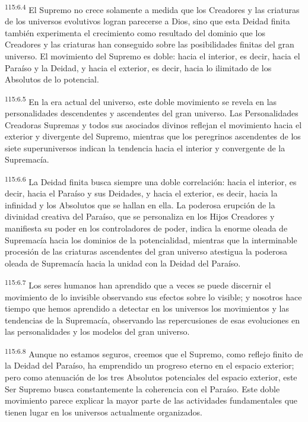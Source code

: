 \par
\textsuperscript{115:6.4} El Supremo no crece solamente a medida que los Creadores y las criaturas de los universos evolutivos logran parecerse a Dios, sino que esta Deidad finita también experimenta el crecimiento como resultado del dominio que los Creadores y las criaturas han conseguido sobre las posibilidades finitas del gran universo. El movimiento del Supremo es doble: hacia el interior, es decir, hacia el Paraíso y la Deidad, y hacia el exterior, es decir, hacia lo ilimitado de los Absolutos de lo potencial.

\par
\textsuperscript{115:6.5} En la era actual del universo, este doble movimiento se revela en las personalidades descendentes y ascendentes del gran universo. Las Personalidades Creadoras Supremas y todos sus asociados divinos reflejan el movimiento hacia el exterior y divergente del Supremo, mientras que los peregrinos ascendentes de los siete superuniversos indican la tendencia hacia el interior y convergente de la Supremacía.

\par
\textsuperscript{115:6.6} La Deidad finita busca siempre una doble correlación: hacia el interior, es decir, hacia el Paraíso y sus Deidades, y hacia el exterior, es decir, hacia la infinidad y los Absolutos que se hallan en ella. La poderosa erupción de la divinidad creativa del Paraíso, que se personaliza en los Hijos Creadores y manifiesta su poder en los controladores de poder, indica la enorme oleada de Supremacía hacia los dominios de la potencialidad, mientras que la interminable procesión de las criaturas ascendentes del gran universo atestigua la poderosa oleada de Supremacía hacia la unidad con la Deidad del Paraíso.

\par
\textsuperscript{115:6.7} Los seres humanos han aprendido que a veces se puede discernir el movimiento de lo invisible observando sus efectos sobre lo visible; y nosotros hace tiempo que hemos aprendido a detectar en los universos los movimientos y las tendencias de la Supremacía, observando las repercusiones de esas evoluciones en las personalidades y los modelos del gran universo.

\par
\textsuperscript{115:6.8} Aunque no estamos seguros, creemos que el Supremo, como reflejo finito de la Deidad del Paraíso, ha emprendido un progreso eterno en el espacio exterior; pero como atenuación de los tres Absolutos potenciales del espacio exterior, este Ser Supremo busca constantemente la coherencia con el Paraíso. Este doble movimiento parece explicar la mayor parte de las actividades fundamentales que tienen lugar en los universos actualmente organizados.


